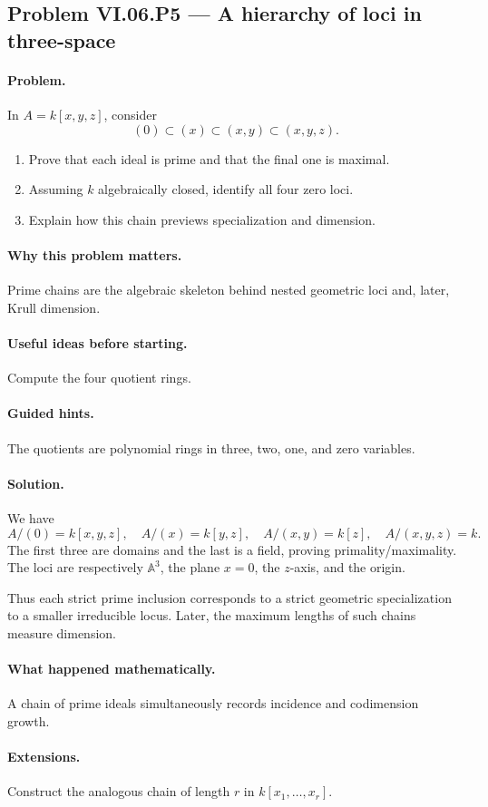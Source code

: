 \subsection*{Problem VI.06.P5 --- A hierarchy of loci in three-space}
\label{prob:vi-06-p5}

\paragraph{Problem.}
In \(A=k[x,y,z]\), consider
\[
(0)\subset (x)\subset(x,y)\subset(x,y,z).
\]
\begin{enumerate}
\item Prove that each ideal is prime and that the final one is maximal.
\item Assuming \(k\) algebraically closed, identify all four zero loci.
\item Explain how this chain previews specialization and dimension.
\end{enumerate}

\ifdefined\FullProblemDossiers
\paragraph{Why this problem matters.}
Prime chains are the algebraic skeleton behind nested geometric loci and, later, Krull
dimension.

\paragraph{Useful ideas before starting.}
Compute the four quotient rings.

\paragraph{Guided hints.}
The quotients are polynomial rings in three, two, one, and zero variables.

\paragraph{Solution.}
We have
\[
A/(0)=k[x,y,z],\quad A/(x)=k[y,z],\quad A/(x,y)=k[z],\quad A/(x,y,z)=k.
\]
The first three are domains and the last is a field, proving primality/maximality.  The loci
are respectively \(\mathbb A^3\), the plane \(x=0\), the \(z\)-axis, and the origin.

Thus each strict prime inclusion corresponds to a strict geometric specialization to a
smaller irreducible locus.  Later, the maximum lengths of such chains measure dimension.

\paragraph{What happened mathematically.}
A chain of prime ideals simultaneously records incidence and codimension growth.

\paragraph{Extensions.}
Construct the analogous chain of length \(r\) in \(k[x_1,\dots,x_r]\).
\fi
